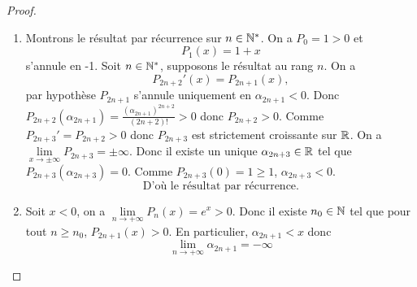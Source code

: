 \documentclass[12pt]{article}
\begin{document}
\begin{proof}
	\phantom{}
	\begin{enumerate}
		\item Montrons le résultat par récurrence sur $n\in\mathbb{N}^{*}$. On a $P_{0}=1>0$ et 
		\begin{equation*}
			P_{1}(x)=1+x	
		\end{equation*}
		s'annule en -1. Soit $n\in\mathbb{N}^{*}$, supposons le résultat au rang $n$. On a 
		\begin{equation*}
			P_{2n+2}'(x)=P_{2n+1}(x),	
		\end{equation*}
		par hypothèse $P_{2n+1}$ s'annule uniquement en $\alpha_{2n+1}<0$. Donc $P_{2n+2}	(\alpha_{2n+1})=\frac{\left(\alpha_{2n+1}\right)^{2n+2}}{(2n+2)!}>0$ donc $P_{2n+2}>0$.
		Comme $P_{2n+3}'=P_{2n+2}>0$ donc $P_{2n+3}$ est strictement croissante sur $\mathbb{R}$. On a $\lim\limits_{x\to\pm\infty}P_{2n+3}=\pm\infty$. Donc il existe un unique $\alpha_{2n+3}\in\mathbb{R}$ tel que $P_{2n+3}(\alpha_{2n+3})=0$. Comme $P_{2n+3}(0)=1\geqslant1$, $\alpha_{2n+3}<0$.
		\begin{equation*}\boxed{\text{D'où le résultat par récurrence.}}\end{equation*}

		\item Soit $x<0$, on a $\lim\limits_{n\to+\infty}P_{n}(x)=e^{x}>0$. Donc il existe $n_{0}\in\mathbb{N}$ tel que pour tout $n\geqslant n_{0}$, $P_{2n+1}(x)>0$. En particulier, $\alpha_{2n+1}<x$ donc 
		\begin{equation*}\boxed{\lim\limits_{n\to+\infty}\alpha_{2n+1}=-\infty}\end{equation*}
	\end{enumerate}
\end{proof}
\end{document}
